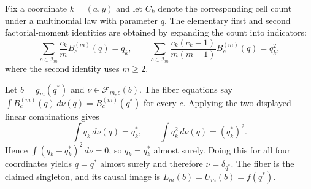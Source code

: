 Fix a coordinate \(k=(a,y)\) and let \(C_k\) denote the corresponding cell count under a multinomial law with parameter \(q\).  The elementary first and second factorial-moment identities are obtained by expanding the count into indicators:
\[
 \sum_{c\in\mathcal I_m}\frac{c_k}{m}B_c^{(m)}(q)=q_k,
 \qquad
 \sum_{c\in\mathcal I_m}\frac{c_k(c_k-1)}{m(m-1)}B_c^{(m)}(q)=q_k^2,
\]
where the second identity uses \(m\geq2\).

Let \(b=g_m(q^*)\) and \(\nu\in\mathcal F_{m,\epsilon}(b)\).  The fiber equations say \(\int B_c^{(m)}(q)\,d\nu(q)=B_c^{(m)}(q^*)\) for every \(c\).  Applying the two displayed linear combinations gives
\[
 \int q_k\,d\nu(q)=q_k^*,
 \qquad
 \int q_k^2\,d\nu(q)=(q_k^*)^2.
\]
Hence \(\int(q_k-q_k^*)^2\,d\nu=0\), so \(q_k=q_k^*\) almost surely.  Doing this for all four coordinates yields \(q=q^*\) almost surely and therefore \(\nu=\delta_{q^*}\).  The fiber is the claimed singleton, and its causal image is \(L_m(b)=U_m(b)=f(q^*)\).